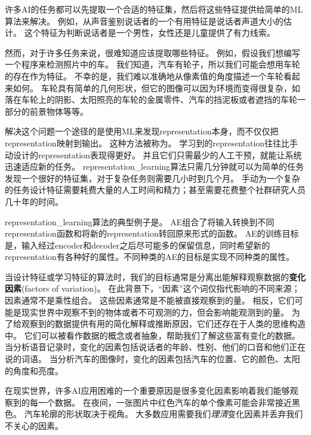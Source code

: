 许多\gls{AI}的任务都可以先提取一个合适的特征集，然后将这些特征提供给简单的\gls{ML}算法来解决。
例如，从声音鉴别说话者的一个有用特征是说话者声道大小的估计。
这个特征为判断说话者是一个男性，女性还是儿童提供了有力线索。

然而，对于许多任务来说，很难知道应该提取哪些特征。
例如，假设我们想编写一个程序来检测照片中的车。
我们知道，汽车有轮子，所以我们可能会想用车轮的存在作为特征。
不幸的是，我们难以准确地从像素值的角度描述一个车轮看起来如何。
车轮具有简单的几何形状，但它的图像可以因为环境而变得很复杂，如落在车轮上的阴影、太阳照亮的车轮的金属零件、汽车的挡泥板或者遮挡的车轮一部分的前景物体等等。


解决这个问题一个途径的是使用\gls{ML}来发现\gls{representation}本身，而不仅仅把\gls{representation}映射到输出。
这种方法被称为。
学习到的\gls{representation}往往比手动设计的\gls{representation}表现得更好。
并且它们只需最少的人工干预，就能让系统迅速适应新的任务。
\gls{representation_learning}算法只需几分钟就可以为简单的任务发现一个很好的特征集，对于复杂任务则需要几小时到几个月。
手动为一个复杂的任务设计特征需要耗费大量的人工时间和精力；甚至需要花费整个社群研究人员几十年的时间。

\gls{representation_learning}算法的典型例子是。
\gls{AE}组合了将输入转换到不同\gls{representation}函数和将新的\gls{representation}转回原来形式的函数。 
\gls{AE}的训练目标是，输入经过\gls{encoder}和\gls{decoder}之后尽可能多的保留信息，同时希望新的\gls{representation}有各种好的属性。不同种类的\gls{AE}的目标是实现不同种类的属性。

当设计特征或学习特征的算法时，我们的目标通常是分离出能解释观察数据的\textbf{变化因素}(factors of variation)。
在此背景下，``因素''这个词仅指代影响的不同来源；因素通常不是乘性组合。
这些因素通常是不能被直接观察到的量。
相反，它们可能是现实世界中观察不到的物体或者不可观测的力，但会影响能观测到的量。
为了给观察到的数据提供有用的简化解释或推断原因，它们还存在于人类的思维构造中。
它们可以被看作数据的概念或者抽象，帮助我们了解这些富有变化的数据。
当分析语音记录时，变化的因素包括说话者的年龄、性别、他们的口音和他们正在说的词语。
当分析汽车的图像时，变化的因素包括汽车的位置、它的颜色、太阳的角度和亮度。


在现实世界，许多\gls{AI}应用困难的一个重要原因是很多变化因素影响着我们能够观察到的每一个数据。
在夜间，一张图片中红色汽车的单个像素可能会非常接近黑色。
汽车轮廓的形状取决于视角。
大多数应用需要我们\emph{理清}变化因素并丢弃我们不关心的因素。

